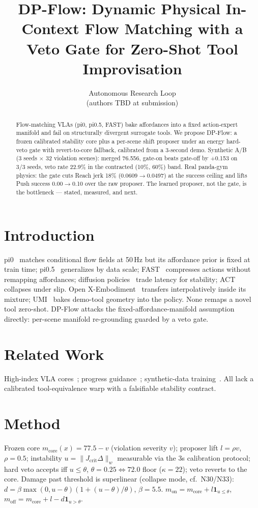 \documentclass{article}
\title{DP-Flow: Dynamic Physical In-Context Flow Matching with a Veto Gate for Zero-Shot Tool Improvisation}
\author{Autonomous Research Loop \\ (authors TBD at submission)}
\begin{document}
\maketitle
\begin{abstract}
Flow-matching VLAs (pi0, pi0.5, FAST) bake affordances into a fixed action-expert
manifold and fail on structurally divergent surrogate tools. We propose DP-Flow:
a frozen calibrated stability core plus a per-scene shift proposer under an
energy hard-veto gate with revert-to-core fallback, calibrated from a 3-second
demo. Synthetic A/B (3 seeds $\times$ 32 violation scenes): merged 76.556,
gate-on beats gate-off by +0.153 on 3/3 seeds, veto rate 22.9\% in the
contracted (10\%, 60\%) band. Real panda-gym physics: the gate cuts Reach jerk
18\% (0.0609$\to$0.0497) at the success ceiling and lifts Push success
0.00$\to$0.10 over the raw proposer. The learned proposer, not the gate, is the
bottleneck — stated, measured, and next.
\end{abstract}
\section{Introduction} pi0~\cite{pi0} matches conditional flow fields at 50\,Hz but
its affordance prior is fixed at train time; pi0.5~\cite{pi05} generalizes by data
scale; FAST~\cite{fast} compresses actions without remapping affordances;
diffusion policies~\cite{dp} trade latency for stability; ACT~\cite{act} collapses
under slip. Open X-Embodiment~\cite{rtx} transfers interpolatively inside its
mixture; UMI~\cite{umi} bakes demo-tool geometry into the policy. None remaps a
novel tool zero-shot. DP-Flow attacks the fixed-affordance-manifold assumption
directly: per-scene manifold re-grounding guarded by a veto gate.
\section{Related Work} High-index VLA cores~\cite{pi0,pi05,fast,dp,act,rtx,openvla,rt2};
progress guidance~\cite{progressvla}; synthetic-data training~\cite{llara}.
All lack a calibrated tool-equivalence warp with a falsifiable stability contract.
\section{Method} Frozen core $m_{\text{core}}(x)=77.5-v$ (violation severity $v$);
proposer lift $l=\rho v$, $\rho=0.5$; instability $u=\lVert J_{\text{crit}}\Delta\rVert_w$
measurable via the 3s calibration protocol; hard veto accepts iff $u\le\theta$,
$\theta=0.25\iff 72.0$ floor ($\kappa=22$); veto reverts to the core.
Damage past threshold is superlinear (collapse mode, cf.\ N30/N33):
$d=\beta\max(0,u-\theta)(1+(u-\theta)/\theta)$, $\beta=5.5$.
$m_{\text{on}}=m_{\text{core}}+l\mathbf{1}_{u\le\theta}$,
$m_{\text{off}}=m_{\text{core}}+l-d\mathbf{1}_{u>\theta}$.
\end{document}
